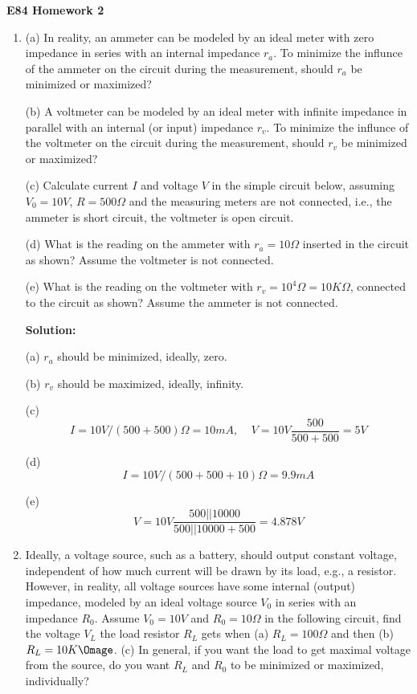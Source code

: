 \usepackage{html}

\begin{center}
{\Large \bf E84 Homework 2}
\end{center}
\begin{enumerate}

The calculations of all problems in this problem set are straight forward.
However, the concepts involving source, load, internal (output) impedance
of the source and the input impedance of the load are very important. After
finding the numerical solutions of the problem, pause and reflect what they
mean. 

\item (a) In reality, an ammeter can be modeled by an ideal meter with zero impedance 
  in series with an internal impedance $r_a$. To minimize the influnce of the ammeter
  on the circuit during the measurement, should $r_a$ be minimized or maximized?

  (b) A voltmeter can be modeled by an ideal meter with infinite impedance in parallel
  with an internal (or input) impedance $r_v$. To minimize the influnce of the voltmeter 
  on the circuit during the measurement, should $r_v$ be minimized or maximized?

  (c) Calculate current $I$ and voltage $V$ in the simple circuit below, assuming 
  $V_0=10V$, $R=500\Omega$ and the measuring meters are not connected, i.e., the ammeter
  is short circuit, the voltmeter is open circuit.

  (d) What is the reading on the ammeter with $r_a=10\Omega$ inserted in the circuit 
  as shown? Assume the voltmeter is not connected.

  (e) What is the reading on the voltmeter with $r_v=10^4 \Omega = 10 K\Omega$, connected
  to the circuit as shown? Assume the ammeter is not connected.


  {\bf Solution:} 

  (a) $r_a$ should be minimized, ideally, zero.

  (b) $r_v$ should be maximized, ideally, infinity.

  (c) \[ I=10V/(500+500)\Omega=10 mA,\;\;\;\;V=10V\frac{500}{500+500}=5 V \]

  (d) \[ I=10V/(500+500+10)\Omega=9.9 mA \]

  (e) \[ V=10V\frac{500||10000}{500||10000+500}=4.878 V \]

\item Ideally, a voltage source, such as a battery, should output constant voltage,
  independent of how much current will be drawn by its load, e.g., a resistor. However, 
  in reality, all voltage sources have some internal (output) impedance, modeled by an 
  ideal voltage source $V_0$ in series with an impedance $R_0$. Assume $V_0=10V$ and 
  $R_0=10\Omega$ in the following circuit, find the voltage $V_L$ the load resistor 
  $R_L$ gets when (a) $R_L=100 \Omega$ and then (b) $R_L=10K\Omage$. 
  (c) In general, if you want the load to get maximal voltage from the source, do you 
  want $R_L$ and $R_0$ to be minimized or maximized, individually?


\end{enumerate}
